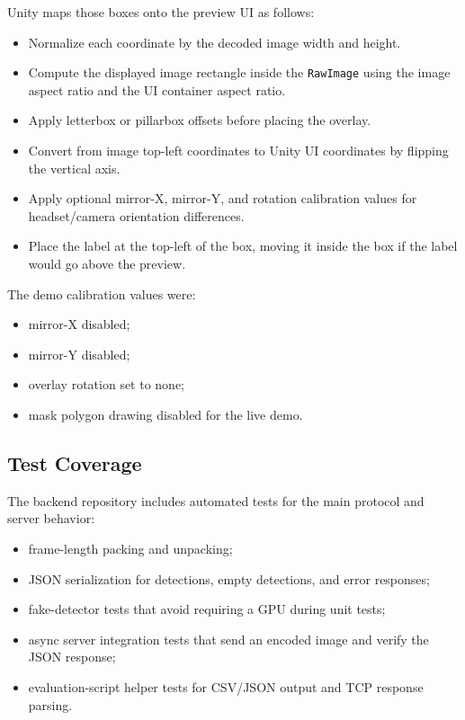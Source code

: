 \documentclass[11pt]{article}
\begin{document}
Unity maps those boxes onto the preview UI as follows:

\begin{itemize}
    \item Normalize each coordinate by the decoded image width and height.
    \item Compute the displayed image rectangle inside the \texttt{RawImage} using the image aspect ratio and the UI container aspect ratio.
    \item Apply letterbox or pillarbox offsets before placing the overlay.
    \item Convert from image top-left coordinates to Unity UI coordinates by flipping the vertical axis.
    \item Apply optional mirror-X, mirror-Y, and rotation calibration values for headset/camera orientation differences.
    \item Place the label at the top-left of the box, moving it inside the box if the label would go above the preview.
\end{itemize}

The demo calibration values were:

\begin{itemize}
    \item mirror-X disabled;
    \item mirror-Y disabled;
    \item overlay rotation set to none;
    \item mask polygon drawing disabled for the live demo.
\end{itemize}

\subsection{Test Coverage}

The backend repository includes automated tests for the main protocol and server behavior:

\begin{itemize}
    \item frame-length packing and unpacking;
    \item JSON serialization for detections, empty detections, and error responses;
    \item fake-detector tests that avoid requiring a GPU during unit tests;
    \item async server integration tests that send an encoded image and verify the JSON response;
    \item evaluation-script helper tests for CSV/JSON output and TCP response parsing.
\end{itemize}
\end{document}
